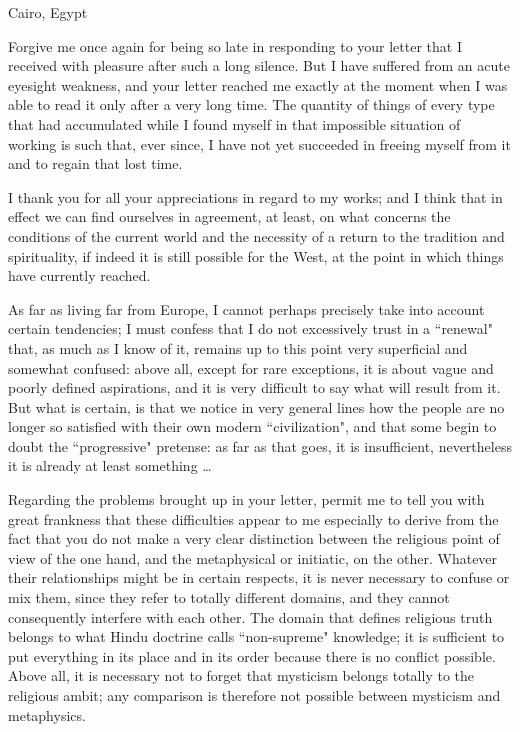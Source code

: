 Cairo, Egypt

Forgive me once again for being so late in responding to your letter that I received with pleasure after such a long silence. But I have suffered from an acute eyesight weakness, and your letter reached me exactly at the moment when I was able to read it only after a very long time. The quantity of things of every type that had accumulated while I found myself in that impossible situation of working is such that, ever since, I have not yet succeeded in freeing myself from it and to regain that lost time.

I thank you for all your appreciations in regard to my works; and I think that in effect we can find ourselves in agreement, at least, on what concerns the conditions of the current world and the necessity of a return to the tradition and spirituality, if indeed it is still possible for the West, at the point in which things have currently reached.

As far as living far from Europe, I cannot perhaps precisely take into account certain tendencies; I must confess that I do not excessively trust in a ``renewal" that, as much as I know of it, remains up to this point very superficial and somewhat confused: above all, except for rare exceptions, it is about vague and poorly defined aspirations, and it is very difficult to say what will result from it. But what is certain, is that we notice in very general lines how the people are no longer so satisfied with their own modern ``civilization", and that some begin to doubt the ``progressive" pretense: as far as that goes, it is insufficient, nevertheless it is already at least something …

Regarding the problems brought up in your letter, permit me to tell you with great frankness that these difficulties appear to me especially to derive from the fact that you do not make a very clear distinction between the religious point of view of the one hand, and the metaphysical or initiatic, on the other. Whatever their relationships might be in certain respects, it is never necessary to confuse or mix them, since they refer to totally different domains, and they cannot consequently interfere with each other. The domain that defines religious truth belongs to what Hindu doctrine calls ``non-supreme" knowledge; it is sufficient to put everything in its place and in its order because there is no conflict possible. Above all, it is necessary not to forget that mysticism belongs totally to the religious ambit; any comparison is therefore not possible between mysticism and metaphysics.

